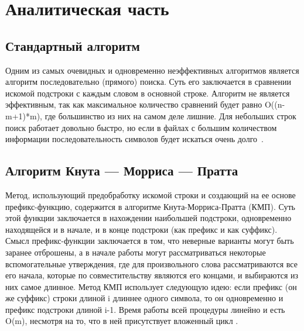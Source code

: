 \section{Аналитическая часть}

\subsection{Стандартный алгоритм}

Одним из самых очевидных и одновременно неэффективных алгоритмов является алгоритм последовательно (прямого) поиска. 
Суть его заключается в сравнении искомой подстроки с каждым словом в основной строке. 
Алгоритм не является эффективным, так как максимальное количество сравнений будет равно O((n-m+1)*m), где большинство из них на самом деле лишние. 
Для небольших строк поиск работает довольно быстро, но если в файлах с большим количеством информации последовательность символов будет искаться очень долго~\cite{вирт2010алгоритмы}.


\subsection{Алгоритм Кнута --- Морриса --- Пратта}
Метод, использующий предобработку искомой строки и создающий на ее основе префикс-функцию, содержится в алгоритме Кнута-Морриса-Пратта (КМП). 
Суть этой функции заключается в нахождении наибольшей подстроки, одновременно находящейся и в начале, и в конце подстроки (как префикс и как суффикс). 
Смысл префикс-функции заключается в том, что неверные варианты могут быть заранее отброшены, а в начале работы могут рассматриваться некоторые вспомогательные утверждения, где для произвольного слова рассматриваются все его начала, которые по совместительству являются его концами, и выбираются из них самое длинное. 
Метод КМП использует следующую идею: если префикс (он же суффикс) строки длиной i длиннее одного символа, то он одновременно и префикс подстроки длиной i-1. Время работы всей процедуры линейно и есть O(m), несмотря на то, что в ней присутствует вложенный цикл \cite{солдатова2018основные}.

